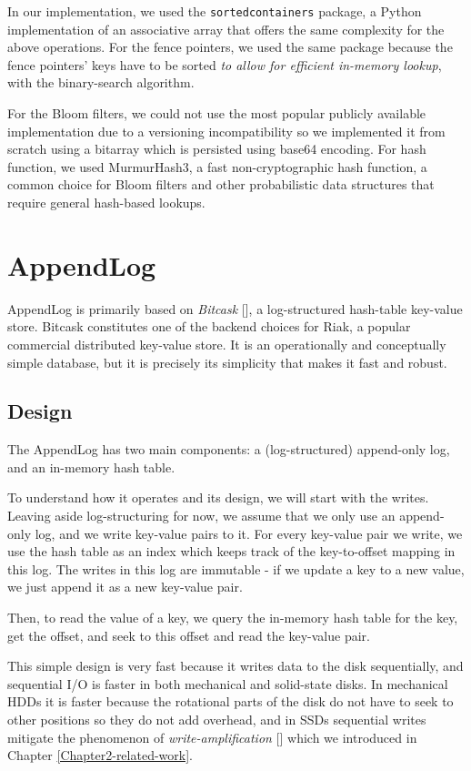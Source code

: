 In our implementation, we used the \verb|sortedcontainers| package, a Python implementation of an associative array that offers the same complexity for the above operations. For the fence pointers, we used the same package because the fence pointers' keys have to be sorted \textit{to allow for efficient in-memory lookup}, with the binary-search algorithm.

For the Bloom filters, we could not use the most popular publicly available implementation due to a versioning incompatibility so we implemented it from scratch using a bitarray which is persisted using base64 encoding. For hash function, we used MurmurHash3, a fast non-cryptographic hash function, a common choice for Bloom filters and other probabilistic data structures that require general hash-based lookups.

\section{AppendLog}

AppendLog is primarily based on \textit{Bitcask} [\cite{bitcask}], a log-structured hash-table key-value store. Bitcask constitutes one of the backend choices for Riak, a popular commercial distributed key-value store. It is an operationally and conceptually simple database, but it is precisely its simplicity that makes it fast and robust.

\subsection{Design}

The AppendLog has two main components: a (log-structured) append-only log, and an in-memory hash table.

To understand how it operates and its design, we will start with the writes.
Leaving aside log-structuring for now, we assume that we only use an append-only log, and we write key-value pairs to it.
For every key-value pair we write, we use the hash table as an index which keeps track of the key-to-offset mapping in this log. The writes in this log are immutable - if we update a key to a new value, we just append it as a new key-value pair.

Then, to read the value of a key, we query the in-memory hash table for the key, get the offset, and seek to this offset and read the key-value pair.

This simple design is very fast because it writes data to the disk sequentially, and sequential I/O is faster in both mechanical and solid-state disks. In mechanical HDDs it is faster because the rotational parts of the disk do not have to seek to other positions so they do not add overhead, and in SSDs sequential writes mitigate the phenomenon of \textit{write-amplification} [\cite{write-amplification}] which we introduced in Chapter \ref{Chapter2-related-work}.

